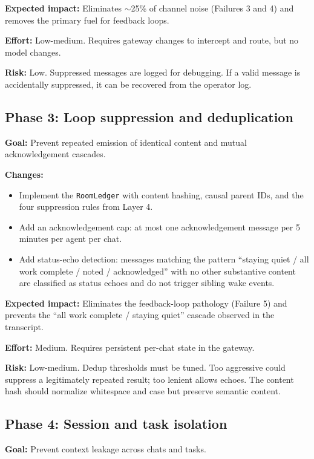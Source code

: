 \documentclass[11pt]{article}
\begin{document}
\textbf{Expected impact:} Eliminates $\sim$25\% of channel noise (Failures 3
and 4) and removes the primary fuel for feedback loops.

\textbf{Effort:} Low-medium.  Requires gateway changes to intercept and
route, but no model changes.

\textbf{Risk:} Low.  Suppressed messages are logged for debugging.  If a
valid message is accidentally suppressed, it can be recovered from the
operator log.

\subsection{Phase 3: Loop suppression and deduplication}

\textbf{Goal:} Prevent repeated emission of identical content and mutual
acknowledgement cascades.

\textbf{Changes:}
\begin{itemize}
\item Implement the \texttt{RoomLedger} with content hashing, causal parent
IDs, and the four suppression rules from Layer 4.
\item Add an acknowledgement cap: at most one acknowledgement message per 5
minutes per agent per chat.
\item Add status-echo detection: messages matching the pattern ``staying
quiet / all work complete / noted / acknowledged'' with no other substantive
content are classified as status echoes and do not trigger sibling wake
events.
\end{itemize}

\textbf{Expected impact:} Eliminates the feedback-loop pathology (Failure 5)
and prevents the ``all work complete / staying quiet'' cascade observed in
the transcript.

\textbf{Effort:} Medium.  Requires persistent per-chat state in the gateway.

\textbf{Risk:} Low-medium.  Dedup thresholds must be tuned.  Too aggressive
could suppress a legitimately repeated result; too lenient allows echoes.
The content hash should normalize whitespace and case but preserve semantic
content.

\subsection{Phase 4: Session and task isolation}

\textbf{Goal:} Prevent context leakage across chats and tasks.
\end{document}
